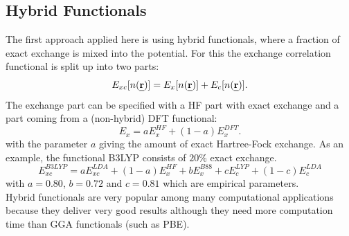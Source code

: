 \documentclass[11pt,DIV=13,BCOR=5mm,a4paper,headinclude]{scrbook}
\def\mathbi#1{\textbf{\em #1}}
\renewcommand{\vec}[1]{\mathbi{#1}}
\begin{document}
\subsection{Hybrid Functionals}
The first approach applied here is using hybrid functionals, where a fraction of exact exchange is mixed into the potential.
For this the exchange correlation functional is split up into two parts:
\begin{equation}
 E_{xc}[n(\vec{r})]=  E_{x}[n(\vec{r})] + E_{c}[n(\vec{r})].
\end{equation}
The exchange part can be specified with a HF part with exact exchange and a part coming from a (non-hybrid) DFT functional:
\begin{equation}
 E_x = aE_x^{HF} + (1-a)E_x^{DFT}.
\end{equation}
with the parameter $a$ giving the amount of exact Hartree-Fock exchange.
As an example, the functional B3LYP consists of $20\%$ exact exchange\cite{Becke1993}.
\begin{equation}
 E_{xc}^{B3LYP}= aE_{xc}^{LDA} + (1-a)E_x^{HF} + bE_x^{B88} + cE_c^{LYP} + (1-c)E_c^{LDA}
\end{equation}
with $a=0.80$, $b=0.72$ and $c=0.81$ which are empirical parameters.
\\
Hybrid functionals are very popular among many computational applications because they deliver very good results although they need more computation time than GGA functionals (such as PBE).
\\
\end{document}
